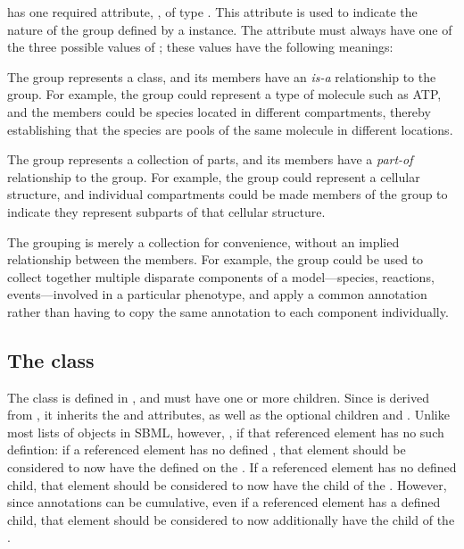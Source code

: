 \Group has one required attribute, , of type .  This attribute is used to indicate the nature of the group defined by a \Group instance.  The  attribute must always have one of the three possible values of ; these values have the following meanings:

\begin{description}[font=\normalfont\ttfamily\color{black},style=nextline]

\item[\token{classification}] The group represents a class, and its members have an \emph{is-a} relationship to the group.  For example, the group could represent a type of molecule such as ATP, and the members could be species located in different compartments, thereby establishing that the species are pools of the same molecule in different locations.

\item[\token{partonomy}] The group represents a collection of parts, and its members have a \emph{part-of} relationship to the group.  For example, the group could represent a cellular structure, and individual compartments could be made members of the group to indicate they represent subparts of that cellular structure.

\item[\token{collection}] The grouping is merely a collection for convenience, without an implied relationship between the members.  For example, the group could be used to collect together multiple disparate components of a model---species, reactions, events---involved in a particular phenotype, and apply a common annotation rather than having to copy the same annotation to each component individually.

\end{description}

\subsection{The  class}
\label{listofmembers-class}

The \ListOfMembers class is defined in , and must have one or more \Member children.  Since \ListOfMembers is derived from \SBase, it inherits the  and  attributes, as well as the optional children \Notes and \Annotation.  Unlike most lists of objects in SBML, however, , if that referenced element has no such defintion: if a referenced element has no defined , that element should be considered to now have the  defined on the \ListOfMembers.  If a referenced element has no defined \Notes child, that element should be considered to now have the \Notes child of the \ListOfMembers.  However, since annotations can be cumulative, even if a referenced element has a defined \Annotation child, that element should be considered to now additionally have the \Annotation child of the \ListOfMembers.

